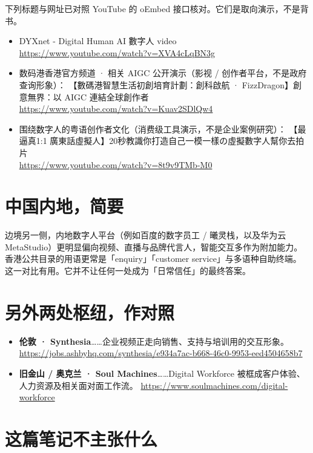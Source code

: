 \documentclass[11pt,a4paper]{ctexart}
\begin{document}
下列标题与网址已对照 YouTube 的 oEmbed 接口核对。它们是取向演示，不是背书。

\begin{itemize}
  \item DYXnet - Digital Human AI 數字人 video \\
    \url{https://www.youtube.com/watch?v=XVA4cLqBN3g}
  \item 数码港香港官方频道 · 相关 AIGC 公开演示（影视 / 创作者平台，不是政府查询形象）：
    【數碼港智慧生活初創培育計劃：創科啟航 · FizzDragon】創意無界：以 AIGC 連結全球創作者 \\
    \url{https://www.youtube.com/watch?v=Kuav2SDlQw4}
  \item 围绕数字人的粤语创作者文化（消费级工具演示，不是企业案例研究）：
    【最逼真1:1 廣東話虛擬人】20秒教識你打造自己一模一樣の虛擬數字人幫你去拍片 \\
    \url{https://www.youtube.com/watch?v=8t9v9TMb-M0}
\end{itemize}

\section*{中国内地，简要}

边境另一侧，内地数字人平台（例如百度的数字员工 / 曦灵栈，以及华为云 MetaStudio）更明显偏向视频、直播与品牌代言人，智能交互多作为附加能力。
香港公共目录的用语更常是「enquiry」「customer service」与多语种自助终端。
这一对比有用。它并不让任何一处成为「日常信任」的最终答案。

\section*{另外两处枢纽，作对照}

\begin{itemize}
  \item \textbf{伦敦 · Synthesia}……企业视频正走向销售、支持与培训用的交互形象。
    \url{https://jobs.ashbyhq.com/synthesia/e934a7ac-b668-46c0-9953-eed4504658b7}
  \item \textbf{旧金山 / 奥克兰 · Soul Machines}……Digital Workforce 被框成客户体验、人力资源及相关面对面工作流。
    \url{https://www.soulmachines.com/digital-workforce}
\end{itemize}

\section*{这篇笔记不主张什么}
\end{document}
